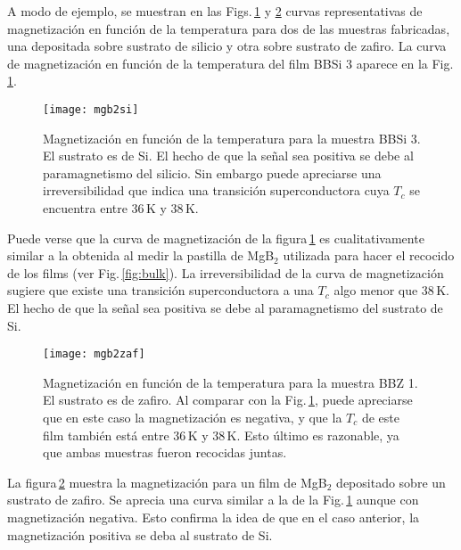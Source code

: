 A modo de ejemplo, se muestran en las Figs.\,\ref{fig:mgb2si} y \ref{fig:mgb2zaf} curvas representativas de magnetización en función de la temperatura para dos de las muestras fabricadas, una depositada sobre sustrato de silicio y otra sobre sustrato de zafiro. La curva de magnetización en función de la temperatura del film BBSi 3 aparece en la Fig.\,\ref{fig:mgb2si}.
\begin{figure}[h!]
 \begin{center}
    \texttt{[image: mgb2si]}
  \end{center}
\caption[Magnetización en función de la temperatura para la muestra BBSi 3.]{Magnetización en función de la temperatura para la muestra BBSi 3. El sustrato es de Si. El hecho de que la señal sea positiva se debe al paramagnetismo del silicio. Sin embargo puede apreciarse una irreversibilidad que indica una transición superconductora cuya $T_c$ se encuentra entre 36\,K y 38\,K.}
\label{fig:mgb2si}
\end{figure}
\newpage
Puede verse que la curva de magnetización de la figura\,\ref{fig:mgb2si} es cualitativamente si\-mi\-lar a la obtenida al medir la pastilla de MgB$_2$ utilizada para hacer el recocido de los films (ver Fig.\,\ref{fig:bulk}). La irreversibilidad de la curva de magnetización sugiere que existe una transición superconductora a una $T_c$ algo menor que 38\,K. El hecho de que la señal sea positiva se debe al paramagnetismo del sustrato de Si\cite{Barrabas2011}.
\begin{figure}[h!]
 \begin{center}
    \texttt{[image: mgb2zaf]}
  \end{center}
\caption[Magnetización en función de la temperatura para la muestra BBZ 1.]{Magnetización en función de la temperatura para la muestra BBZ 1. El sustrato es de zafiro. Al comparar con la Fig.\,\ref{fig:mgb2si}, puede apreciarse que en este caso la magnetización es negativa, y que la $T_c$ de este film también está entre 36\,K y 38\,K. Esto último es razonable, ya que ambas muestras fueron recocidas juntas.}
\label{fig:mgb2zaf}
\end{figure}

La figura\,\ref{fig:mgb2zaf} muestra la magnetización para un film de MgB$_2$ depositado sobre un sustrato de zafiro. Se aprecia una curva similar a la de la Fig.\,\ref{fig:mgb2si} aunque con magnetización negativa. Esto confirma la idea de que en el caso anterior, la magnetización positiva se deba al sustrato de Si.

